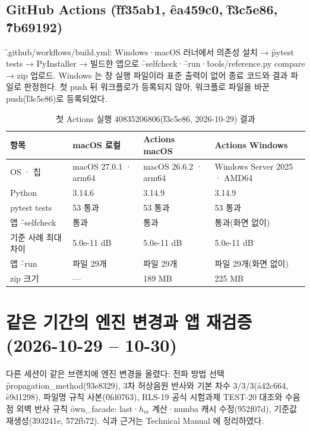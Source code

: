 \documentclass[10.5pt,a4paper]{article}
\begin{document}
\subsection{GitHub Actions (\f{ff35ab1}, \f{ea459c0}, \f{f3c5e86}, \f{7b69192})}
 \f{.github/workflows/build.yml}: Windows·macOS 러너에서 의존성 설치 → \f{pytest tests} → PyInstaller → 빌드한 앱으로 \f{--selfcheck}·\f{--run}·\f{tools/reference.py compare} → zip 업로드. Windows 는 창 실행 파일이라 표준 출력이 없어 종료 코드와 결과 파일로 판정한다. 첫 push 뒤 워크플로가 등록되지 않아, 워크플로 파일을 바꾼 push(\f{f3c5e86})로 등록되었다.

\begin{table}[h]\centering\small
\caption{첫 Actions 실행 40835206806(\f{f3c5e86}, 2026-10-29) 결과}\label{tab:ci1}
\begin{tabularx}{\textwidth}{P{34mm}LLL}
\toprule
항목 & macOS 로컬 & Actions macOS & Actions Windows \\ \midrule
OS · 칩 & macOS 27.0.1 · arm64 & macOS 26.6.2 · arm64 & Windows Server 2025 · AMD64 \\
Python & 3.14.6 & 3.14.9 & 3.14.9 \\
pytest tests & 53 통과 & 53 통과 & 53 통과 \\
앱 \f{--selfcheck} & 통과 & 통과 & 통과(화면 없이) \\
기준 사례 최대 차이 & 5.0e-11 dB & 5.0e-11 dB & 5.0e-11 dB \\
앱 \f{--run} & 파일 29개 & 파일 29개 & 파일 29개(화면 없이) \\
zip 크기 & — & 189 MB & 225 MB \\
\bottomrule
\end{tabularx}
\end{table}

\section{같은 기간의 엔진 변경과 앱 재검증 (2026-10-29 – 10-30)}\label{sec:engine}

다른 세션이 같은 브랜치에 엔진 변경을 올렸다: 전파 방법 선택 \f{propagation\_method}(\f{93e8329}), 3차 허상음원 반사와 기본 차수 3/3/3(\f{a42c664}, \f{e9d1298}), 파일명 규칙 사본(\f{0fd0763}), RLS-19 공식 시험과제 TEST-20 대조와 수음점 외벽 반사 규칙 \f{own\_facade: last}·$h_m$ 계산·numba 캐시 수정(\f{952f07d}), 기준값 재생성(\f{393241e}, \f{572fb72}). 식과 근거는 Technical Manual 에 정리하였다.
\end{document}
